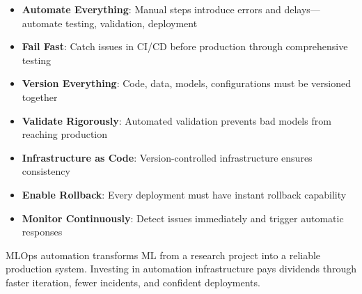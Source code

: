 \begin{itemize}
    \item \textbf{Automate Everything}: Manual steps introduce errors and delays---automate testing, validation, deployment
    \item \textbf{Fail Fast}: Catch issues in CI/CD before production through comprehensive testing
    \item \textbf{Version Everything}: Code, data, models, configurations must be versioned together
    \item \textbf{Validate Rigorously}: Automated validation prevents bad models from reaching production
    \item \textbf{Infrastructure as Code}: Version-controlled infrastructure ensures consistency
    \item \textbf{Enable Rollback}: Every deployment must have instant rollback capability
    \item \textbf{Monitor Continuously}: Detect issues immediately and trigger automatic responses
\end{itemize}

MLOps automation transforms ML from a research project into a reliable production system. Investing in automation infrastructure pays dividends through faster iteration, fewer incidents, and confident deployments.
